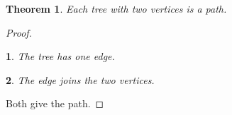\documentclass{article}
\newtheorem{thm}{Theorem}
\newtheorem{stat}{}[thm]
\begin{document}
\begin{thm} Each tree with two vertices is a path. \end{thm}
\begin{proof}
\begin{stat} The tree has one edge. \end{stat}
\begin{stat} The edge joins the two vertices. \end{stat}
Both give the path.
\end{proof}
\end{document}
